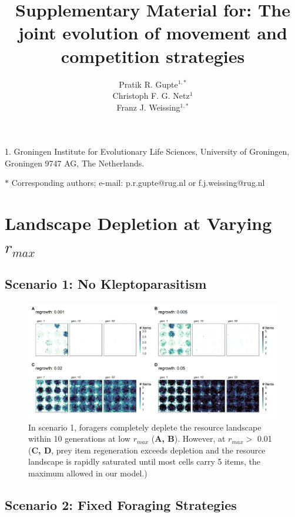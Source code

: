 \documentclass[11pt]{article}
\title{Supplementary Material for: The joint evolution of movement and competition strategies}
\author{Pratik R. Gupte$^{1,\ast}$ \\ 
        Christoph F. G. Netz$^{1}$ \\ 
        Franz J. Weissing$^{1, \ast}$}
\date{}
\begin{document}
\maketitle

\noindent{} 1. Groningen Institute for Evolutionary Life Sciences, University of Groningen, Groningen 9747 AG, The Netherlands.

\noindent{} $\ast$ Corresponding authors; e-mail: p.r.gupte@rug.nl or f.j.weissing@rug.nl

\bigskip

\newpage

\section{Landscape Depletion at Varying $r_{max}$}

\subsection{Scenario 1: No Kleptoparasitism}

\begin{figure}[h!]
        \centering
        \includegraphics*[width=1.0\textwidth]{figures/fig_landscape_rmax_foragers.png}
        \caption{In scenario 1, foragers completely deplete the resource landscape within 10 generations at low $r_{max}$ (\textbf{A, B}).
        However, at $r_{max} >$ 0.01 (\textbf{C, D}, prey item regeneration exceeds depletion and the resource landscape is rapidly saturated until most cells carry 5 items, the maximum allowed in our model.)}
\end{figure}

\newpage

\subsection{Scenario 2: Fixed Foraging Strategies}
\end{document}
